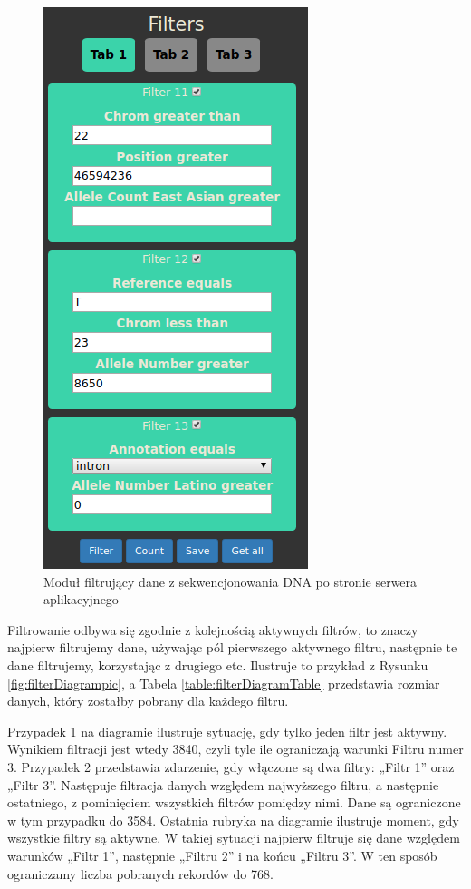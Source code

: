 \documentclass[a4paper,12pt,twoside]{article}
\begin{document}
\begin{figure}
\centering
\includegraphics[height=0.95\textheight]{obrazy/aplikacja/filters.png}
\caption{Moduł filtrujący dane z sekwencjonowania DNA po stronie serwera aplikacyjnego}
\label{fig:filterspic}
\end{figure}

\newpage

Filtrowanie odbywa się zgodnie z kolejnością aktywnych filtrów, to znaczy najpierw filtrujemy dane, używając pól pierwszego aktywnego filtru, następnie te dane filtrujemy, korzystając z drugiego etc. Ilustruje to przykład z Rysunku \ref{fig:filterDiagrampic}, a Tabela \ref{table:filterDiagramTable}
przedstawia rozmiar danych, który zostałby pobrany dla każdego filtru.

Przypadek 1 na diagramie ilustruje sytuację, gdy tylko jeden filtr jest aktywny.
Wynikiem filtracji jest wtedy 3840, czyli tyle ile ograniczają warunki Filtru numer 3.
Przypadek 2 przedstawia zdarzenie, gdy włączone są dwa filtry: „Filtr 1” oraz „Filtr 3”. Następuje filtracja danych względem najwyższego filtru, a następnie ostatniego,
z pominięciem wszystkich filtrów pomiędzy nimi.
Dane są ograniczone w tym przypadku do 3584.
Ostatnia rubryka na diagramie ilustruje moment, gdy wszystkie filtry są aktywne.
W takiej sytuacji najpierw filtruje się dane względem warunków „Filtr 1”,
następnie „Filtru 2” i na końcu „Filtru 3”. W ten sposób ograniczamy
liczba pobranych rekordów do 768.
\end{document}

